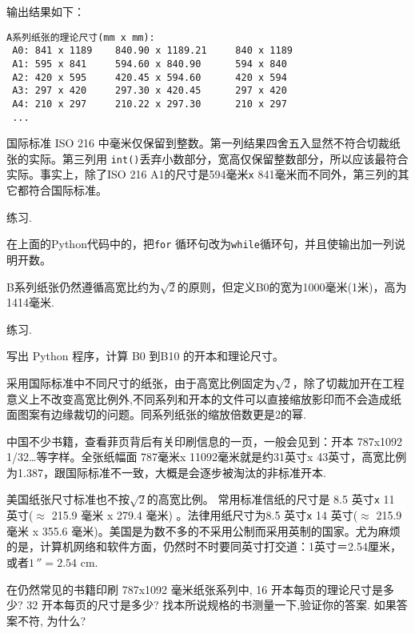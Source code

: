 \documentclass[main.tex]{subfiles}
\begin{document}
输出结果如下：
\vspace{.4cm}
\begin{spacing}{0.8}
	\begin{small}
\begin{lstlisting}
A系列纸张的理论尺寸(mm x mm):
 A0: 841 x 1189    840.90 x 1189.21     840 x 1189
 A1: 595 x 841     594.60 x 840.90      594 x 840
 A2: 420 x 595     420.45 x 594.60      420 x 594
 A3: 297 x 420     297.30 x 420.45      297 x 420
 A4: 210 x 297     210.22 x 297.30      210 x 297
 ...

\end{lstlisting}
\end{small}
\end{spacing}
\vspace{.4cm}\label{a_paper_py}
国际标准 ISO 216 中毫米仅保留到整数。第一列结果四舍五入显然不符合切裁纸张的实际。第三列用 \texttt{int()}丢弃小数部分，宽高仅保留整数部分，所以应该最符合实际。事实上，除了ISO 216 A1的尺寸是594毫米\texttt{x}{ }841毫米而不同外，第三列的其它都符合国际标准。

\begin{kaishu}练习.\end{kaishu} 在上面的Python代码中的，把\texttt{for} 循环句改为\texttt{while}循环句，并且使输出加一列说明开数。

B系列纸张仍然遵循高宽比约为$\sqrt{2}$的原则，但定义B0的宽为1000毫米(1米)，高为1414毫米.

\begin{kaishu}练习.\end{kaishu} 写出 Python 程序，计算 B0 到B10 的开本和理论尺寸。 

采用国际标准中不同尺寸的纸张，由于高宽比例固定为$\sqrt{2}$，除了切裁加开在工程意义上不改变高宽比例外,不同系列和开本的文件可以直接缩放影印而不会造成纸面图案有边缘裁切的问题。同系列纸张的缩放倍数更是2的幂.

中国不少书籍，查看菲页背后有关印刷信息的一页，一般会见到：开本 787x1092 1/32…等字样。全张纸幅面 787毫米x{ }11092毫米就是约31英寸x{ }43英寸，高宽比例为1.387，跟国际标准不一致，大概是会逐步被淘汰的非标准开本.

美国纸张尺寸标准也不按$\sqrt{2}$的高宽比例。 常用标准信纸的尺寸是 8.5 英寸\texttt{x}{ }11 英寸($\approx$ 215.9 毫米 x 279.4 毫米) 。法律用纸尺寸为8.5 英寸\texttt{x}{ }14 英寸($\approx$ 215.9 毫米 x 355.6 毫米)。美国是为数不多的不采用公制而采用英制的国家。尤为麻烦的是，计算机网络和软件方面，仍然时不时要同英寸打交道：1英寸＝2.54厘米，或者$1\,'' = 2.54$ cm.

\begin{Exercises}
	\item 在仍然常见的书籍印刷 787x1092 毫米纸张系列中, 16 开本每页的理论尺寸是多少? 32 开本每页的尺寸是多少? 找本所说规格的书测量一下,验证你的答案. 如果答案不符, 为什么?
\end{Exercises}

\newpage
\end{document}
